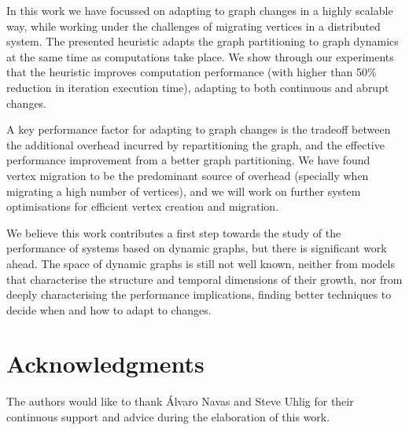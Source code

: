 \documentclass{sig-alternate-10pt}
\begin{document}
In this work we have focussed on adapting to graph changes in a highly scalable way, while working under the challenges of migrating vertices in a distributed system. The presented heuristic adapts the graph partitioning to graph dynamics at the same time as computations take place. We show through our experiments that the heuristic improves computation performance (with higher than 50\% reduction in iteration execution time), adapting to both continuous and abrupt changes. 



A key performance factor for adapting to graph changes is the tradeoff between the additional overhead incurred by repartitioning the graph, and the effective performance improvement from a better graph partitioning. We have found vertex migration to be the predominant source of overhead (specially when migrating a high number of vertices), and we will work on further system optimisations for efficient vertex creation and migration. 

We believe this work contributes a first step towards the study of the performance of systems based on dynamic graphs, but there is significant work ahead. The space of dynamic graphs is still not well known, neither from models that characterise the structure and temporal dimensions of their growth, nor from deeply characterising the performance implications, finding better techniques to decide when and how to adapt to changes. 

\section{Acknowledgments}

The authors would like to thank  \'{A}lvaro Navas and Steve Uhlig for their continuous support and advice during the elaboration of this work.




\end{document}
